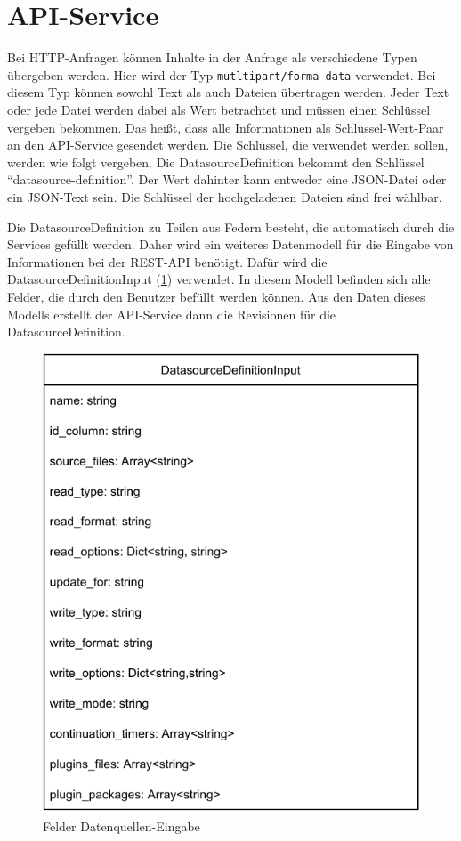 \section{API-Service}

Bei HTTP-Anfragen können Inhalte in der Anfrage als verschiedene Typen übergeben werden.
Hier wird der Typ \verb|mutltipart/forma-data| verwendet.
Bei diesem Typ können sowohl Text als auch Dateien übertragen werden.
Jeder Text oder jede Datei werden dabei als Wert betrachtet und müssen einen Schlüssel vergeben bekommen.
Das heißt, dass alle Informationen als Schlüssel-Wert-Paar an den API-Service gesendet werden.
Die Schlüssel, die verwendet werden sollen, werden wie folgt vergeben.
Die DatasourceDefinition bekommt den Schlüssel "`datasource-definition"'.
Der Wert dahinter kann entweder eine JSON-Datei oder ein JSON-Text sein.
Die Schlüssel der hochgeladenen Dateien sind frei wählbar.

Die DatasourceDefinition zu Teilen aus Federn besteht, die automatisch durch die Services gefüllt werden.
Daher wird ein weiteres Datenmodell für die Eingabe von Informationen bei der REST-API benötigt.
Dafür wird die DatasourceDefinitionInput (\cref{fig:datasource-definition-input}) verwendet.
In diesem Modell befinden sich alle Felder, die durch den Benutzer befüllt werden können.
Aus den Daten dieses Modells erstellt der API-Service dann die Revisionen für die DatasourceDefinition.

\begin{figure}
    \centering
    \includegraphics[width=.65\textwidth]{Grafiken/Umsetzung-Definition-Input.pdf}
    \caption{Felder Datenquellen-Eingabe}
    \label{fig:datasource-definition-input}
\end{figure}

